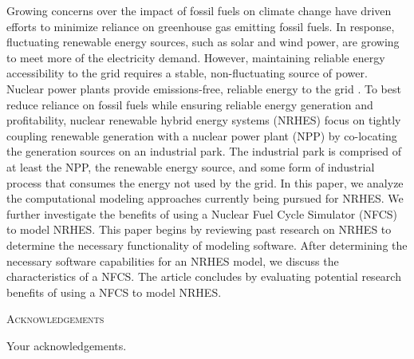 \documentclass[12pt]{UIdahoMastersThesis}
\begin{document}
Growing concerns over the impact of fossil fuels on climate change have driven efforts to minimize reliance on greenhouse gas emitting fossil fuels. In response, fluctuating renewable energy sources, such as solar and wind power, are growing to meet more of the electricity demand. However, maintaining reliable energy accessibility to the grid requires a stable, non-fluctuating source of power. Nuclear power plants provide emissions-free, reliable energy to the grid \cite{IPCC}. To best reduce reliance on fossil fuels while ensuring reliable energy generation and profitability, nuclear renewable hybrid energy systems (NRHES) focus on tightly coupling renewable generation with a nuclear power plant (NPP) by co-locating the generation sources on an industrial park. The industrial park is comprised of at least the NPP, the renewable energy source, and some form of industrial process that consumes the energy not used by the grid. In this paper, we analyze the computational modeling approaches currently being pursued for NRHES. We further investigate the benefits of using a Nuclear Fuel Cycle Simulator (NFCS) to model NRHES. This paper begins by reviewing past research on NRHES to determine the necessary functionality of modeling software. After determining the necessary software capabilities for an NRHES model, we discuss the characteristics of a NFCS. The article concludes by evaluating potential research benefits of using a NFCS to model NRHES. 

\newpage


 \begin{center}
 	{\LARGE\textsc{Acknowledgements}}
 \end{center}

Your acknowledgements.

\newpage






\tableofcontents
\newpage
\end{document}
